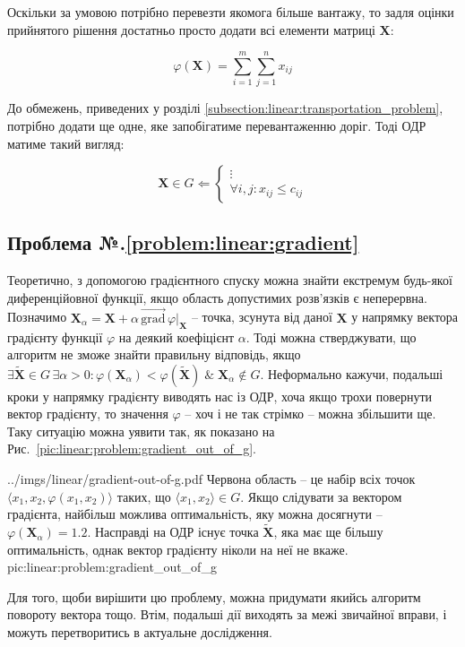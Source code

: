 \documentclass[\main/book.tex]{subfiles}
\begin{document}
Оскільки за умовою потрібно \flqq{}перевезти якомога більше вантажу\frqq{}, то задля оцінки прийнятого рішення достатньо просто додати всі елементи матриці $\mathbf{X}$:

\[
 \varphi(\mathbf{X}) = \sum_{i=1}^{m} \sum_{j=1}^{n} x_{ij}
\]

До обмежень, приведених у розділі \ref{subsection:linear:transportation_problem}, потрібно додати ще одне, яке запобігатиме перевантаженню доріг. Тоді ОДР матиме такий вигляд:

\[
 \mathbf{X} \in G \Leftarrow \left\{
  \begin{array}{l}
   \vdots \\
   \forall i, j: x_{ij} \leq c_{ij}
  \end{array}
 \right.
\]

\subsection*{Проблема №.\ref{problem:linear:gradient}}

Теоретично, з допомогою градієнтного спуску можна знайти екстремум будь-якої диференційовної функції, якщо область допустимих розв'язків є неперервна. Позначимо $\mathbf{X}_\alpha = \mathbf{X} + \alpha \, \overrightarrow{\textrm{grad}} \, \varphi \Bigr|_\mathbf{X}$ -- точка, зсунута від даної $\mathbf{X}$ у напрямку вектора градієнту функції $\varphi$ на деякий коефіцієнт $\alpha$. Тоді можна стверджувати, що алгоритм не зможе знайти правильну відповідь, якщо $\exists \widetilde{\mathbf{X}} \in G \, \exists \alpha > 0: \varphi(\mathbf{X}_\alpha) < \varphi(\widetilde{\mathbf{X}}) \;\&\; \mathbf{X}_\alpha \notin G$. Неформально кажучи, подальші кроки у напрямку градієнту виводять нас із ОДР, хоча якщо трохи повернути вектор градієнту, то значення $\varphi$ -- хоч і не так стрімко -- можна збільшити ще. Таку ситуацію можна уявити так, як показано на Рис.~\ref{pic:linear:problem:gradient_out_of_g}.

\illustration
 {../imgs/linear/gradient-out-of-g.pdf}
 {Червона область -- це набір всіх точок $\langle x_1, x_2, \varphi(x_1, x_2)\rangle$ таких, що $\langle x_1, x_2 \rangle \in G$. Якщо слідувати за вектором градієнта, найбільш можлива оптимальність, яку можна досягнути -- $\varphi(\mathbf{X}_\alpha)=1.2$. Насправді на ОДР існує точка $\widetilde{\mathbf{X}}$, яка має ще більшу оптимальність, однак вектор градієнту ніколи на неї не вкаже.}
 {pic:linear:problem:gradient_out_of_g}

Для того, щоби вирішити цю проблему, можна придумати якийсь алгоритм повороту вектора тощо. Втім, подальші дії виходять за межі звичайної вправи, і можуть перетворитись в актуальне дослідження.
\end{document}

